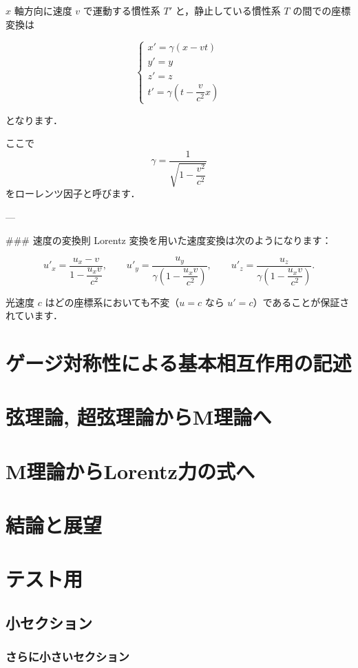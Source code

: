 \documentclass{ltjsarticle}
\begin{document}
$x$ 軸方向に速度 $v$ で運動する慣性系 $T'$ と，静止している慣性系 $T$ の間での座標変換は

\[
\begin{cases}
x' = \gamma (x - v t) \\
y' = y \\
z' = z \\
t' = \gamma \left( t - \dfrac{v}{c^2} x \right)
\end{cases}
\]

となります．

ここで
\[
\gamma = \frac{1}{\sqrt{1 - \dfrac{v^2}{c^2}}}
\]
をローレンツ因子と呼びます．

---

### 速度の変換則
Lorentz 変換を用いた速度変換は次のようになります：

\[
u'_x = \frac{u_x - v}{1 - \dfrac{u_x v}{c^2}}, 
\qquad
u'_y = \frac{u_y}{\gamma \left(1 - \dfrac{u_x v}{c^2}\right)},
\qquad
u'_z = \frac{u_z}{\gamma \left(1 - \dfrac{u_x v}{c^2}\right)}.
\]

光速度 $c$ はどの座標系においても不変（$u = c$ なら $u' = c$）であることが保証されています．




\section{ゲージ対称性による基本相互作用の記述}
\section{弦理論, 超弦理論からM理論へ}
\section{M理論からLorentz力の式へ}
\section{結論と展望}

\section{テスト用}
\subsection{小セクション}
\subsubsection{さらに小さいセクション}
\end{document}
